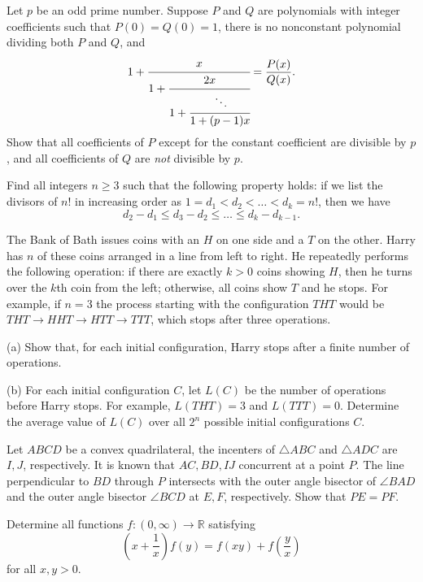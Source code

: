\documentclass[11pt]{scrartcl}
\begin{document}
\begin{problem}[57065759079551]
Let $p$ be an odd prime number. Suppose $P$ and $Q$ are polynomials with integer coefficients such that $P(0)=Q(0)=1$, there is no nonconstant polynomial dividing both $P$ and $Q$, and
\[
  1 + \cfrac{x}{1 + \cfrac{2x}{1 + \cfrac{\ddots}{1 +
  (p-1)x}}}=\frac{P(x)}{Q(x)}.
\]Show that all coefficients of $P$ except for the constant coefficient are divisible by $p$, and all coefficients of $Q$ are \emph{not} divisible by $p$.
\end{problem}
\begin{problem}[4298196647118074747]
	Find all integers $n \geq 3$ such that the following property holds: if we list the divisors of $n!$ in increasing order as $1 = d_1 < d_2 < \dots < d_k = n!$, then we have
\[ d_2 - d_1 \leq d_3 - d_2 \leq \dots \leq d_k - d_{k-1}. \]
\end{problem}
\begin{problem}[623590906176957]
	The Bank of Bath issues coins with an $H$ on one side and a $T$ on the other. Harry has $n$ of these coins arranged in a line from left to right. He repeatedly performs the following operation: if there are exactly $k>0$ coins showing $H$, then he turns over the $k$th coin from the left; otherwise, all coins show $T$ and he stops. For example, if $n=3$ the process starting with the configuration $THT$ would be $THT \to HHT  \to HTT \to TTT$, which stops after three operations.

(a) Show that, for each initial configuration, Harry stops after a finite number of operations.

(b) For each initial configuration $C$, let $L(C)$ be the number of operations before Harry stops. For example, $L(THT) = 3$ and $L(TTT) = 0$. Determine the average value of $L(C)$ over all $2^n$ possible initial configurations $C$.
\end{problem}
\begin{problem}[4308913658510445082]
Let $ABCD$ be a convex quadrilateral, the incenters of $\triangle ABC$ and $\triangle ADC$ are $I,J$, respectively. It is known that $AC,BD,IJ$ concurrent at a point $P$. The line perpendicular to $BD$ through $P$ intersects with the outer angle bisector of $\angle BAD$ and the outer angle bisector $\angle BCD$ at $E,F$, respectively. Show that $PE=PF$.
\end{problem}
\begin{problem}[5514383858686655851]
Determine all functions $f:(0,\infty)\to\mathbb{R}$ satisfying$$\left(x+\frac{1}{x}\right)f(y)=f(xy)+f\left(\frac{y}{x}\right)$$for all $x,y>0$.
\end{problem}
\end{document}
